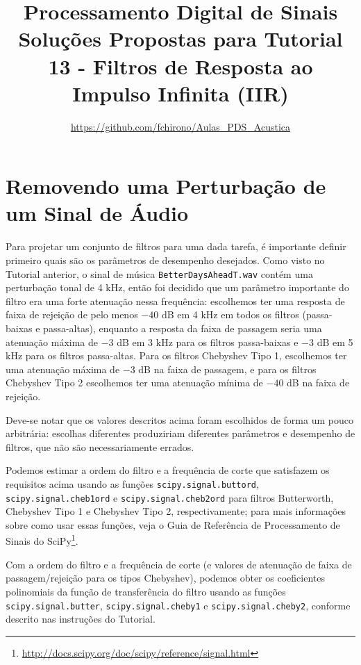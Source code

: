 \documentclass[a4paper,twoside,12pt]{article}
\title{\vspace{-2cm} Processamento Digital de Sinais\\ Soluções Propostas para Tutorial 13 - Filtros de Resposta ao Impulso Infinita (IIR)}
\author{\url{https://github.com/fchirono/Aulas_PDS_Acustica}}
\begin{document}
	\date{}
	\maketitle
	
	\setcounter{section}{1}
	\section{Removendo uma Perturbação de um Sinal de Áudio}
	
	Para projetar um conjunto de filtros para uma dada tarefa, é importante definir primeiro quais são os parâmetros de desempenho desejados. Como visto no Tutorial anterior, o sinal de música {\tt BetterDaysAheadT.wav} contém uma perturbação tonal de 4 kHz, então foi decidido que um parâmetro importante do filtro era uma forte atenuação nessa frequência: escolhemos ter uma resposta de faixa de rejeição de pelo menos $-40$ dB em 4 kHz em todos os filtros (passa-baixas e passa-altas), enquanto a resposta da faixa de passagem seria uma atenuação máxima de $-3$ dB em 3 kHz para os filtros passa-baixas e $-3$ dB em 5 kHz para os filtros passa-altas. Para os filtros Chebyshev Tipo 1, escolhemos ter uma atenuação máxima de $-3$ dB na faixa de passagem, e para os filtros Chebyshev Tipo 2 escolhemos ter uma atenuação mínima de $-40$ dB na faixa de rejeição.
	
	Deve-se notar que os valores descritos acima foram escolhidos de forma um pouco arbitrária: escolhas diferentes produziriam diferentes parâmetros e desempenho de filtros, que não são necessariamente errados.
	
	Podemos estimar a ordem do filtro e a frequência de corte que satisfazem os requisitos acima usando as funções {\tt scipy.signal.buttord}, {\tt scipy.signal.cheb1ord} e {\tt scipy.signal.cheb2ord} para filtros Butterworth, Chebyshev Tipo 1 e Chebyshev Tipo 2, respectivamente; para mais informações sobre como usar essas funções, veja o Guia de Referência de Processamento de Sinais do SciPy\footnote{\url{http://docs.scipy.org/doc/scipy/reference/signal.html}}.
	
	Com a ordem do filtro e a frequência de corte (e valores de atenuação de faixa de passagem/rejeição para os tipos Chebyshev), podemos obter os coeficientes polinomiais da função de transferência do filtro usando as funções {\tt scipy.signal.butter}, {\tt scipy.signal.cheby1} e {\tt scipy.signal.cheby2}, conforme descrito nas instruções do Tutorial.
	
\end{document}
